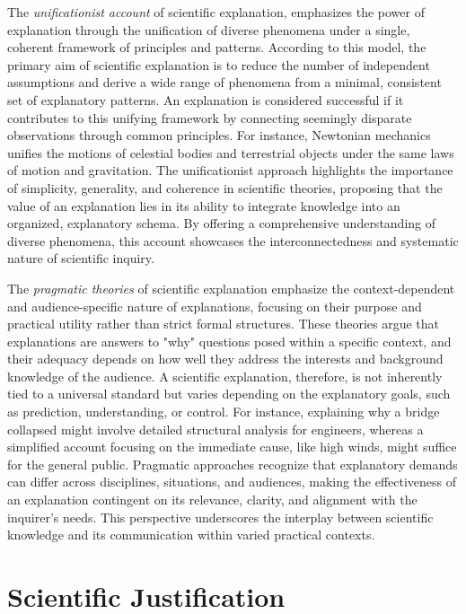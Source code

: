 The \emph{unificationist account} of scientific explanation, emphasizes the power of explanation through the unification of diverse phenomena under a single, coherent framework of principles and patterns. According to this model, the primary aim of scientific explanation is to reduce the number of independent assumptions and derive a wide range of phenomena from a minimal, consistent set of explanatory patterns. An explanation is considered successful if it contributes to this unifying framework by connecting seemingly disparate observations through common principles. For instance, Newtonian mechanics unifies the motions of celestial bodies and terrestrial objects under the same laws of motion and gravitation. The unificationist approach highlights the importance of simplicity, generality, and coherence in scientific theories, proposing that the value of an explanation lies in its ability to integrate knowledge into an organized, explanatory schema. By offering a comprehensive understanding of diverse phenomena, this account showcases the interconnectedness and systematic nature of scientific inquiry.

The \emph{pragmatic theories} of scientific explanation emphasize the context-dependent and audience-specific nature of explanations, focusing on their purpose and practical utility rather than strict formal structures. These theories argue that explanations are answers to "why" questions posed within a specific context, and their adequacy depends on how well they address the interests and background knowledge of the audience. A scientific explanation, therefore, is not inherently tied to a universal standard but varies depending on the explanatory goals, such as prediction, understanding, or control. For instance, explaining why a bridge collapsed might involve detailed structural analysis for engineers, whereas a simplified account focusing on the immediate cause, like high winds, might suffice for the general public. Pragmatic approaches recognize that explanatory demands can differ across disciplines, situations, and audiences, making the effectiveness of an explanation contingent on its relevance, clarity, and alignment with the inquirer's needs. This perspective underscores the interplay between scientific knowledge and its communication within varied practical contexts.

%
%

\section{Scientific Justification}
\label{sec:scientific_justification}

